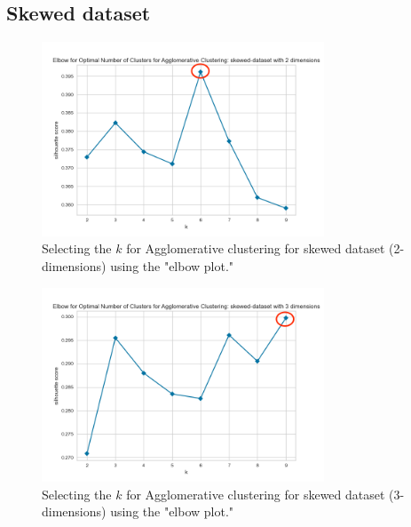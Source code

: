\subsection{Skewed dataset}
\begin{figure}[H]
  \includegraphics[width=0.75\textwidth]{Method/images/k-values/skewed-dataset-2-agglomerative.png}
  \caption{Selecting the $k$ for Agglomerative clustering for skewed dataset (2-dimensions) using the "elbow plot."}
  \label{hyperparameters:agglomerative-skewed-dataset-2d}
\end{figure}
\begin{figure}[H]
  \includegraphics[width=0.75\textwidth]{Method/images/k-values/skewed-dataset-3-agglomerative.png}
  \caption{Selecting the $k$ for Agglomerative clustering for skewed dataset (3-dimensions) using the "elbow plot."}
  \label{hyperparameters:agglomerative-skewed-dataset-3d}
\end{figure}